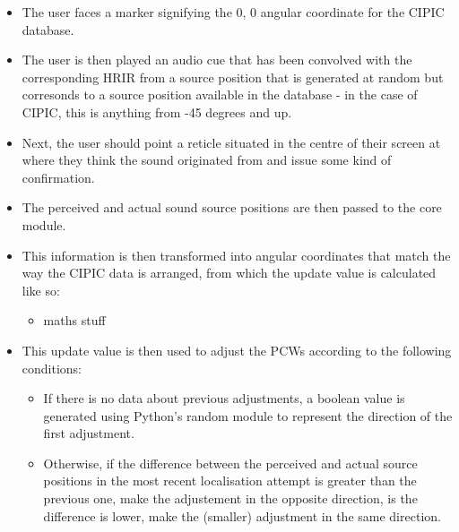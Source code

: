 \begin{itemize}
\item The user faces a marker signifying the 0, 0 angular coordinate for the CIPIC database.
\item The user is then played an audio cue that has been convolved with the corresponding HRIR from a source position that is generated at random but corresonds to a source position available in the database - in the case of CIPIC, this is anything from -45 degrees and up.
\item  Next, the user should point a reticle situated in the centre of their screen at where they think the sound originated from and issue some kind of confirmation. 
\item The perceived and actual sound source positions are then passed to the core module.
\item This information is then transformed into angular coordinates that match the way the CIPIC data is arranged, from which the update value is calculated like so:
\begin{itemize}
\item maths stuff
\end{itemize}
\item This update value is then used to adjust the PCWs according to the following conditions:
\begin{itemize}
\item If there is no data about previous adjustments, a boolean value is generated using Python's random module\citep{python random} to represent the direction of the first adjustment. 
\item Otherwise, if the difference between the perceived and actual source positions in the most recent localisation attempt is greater than the previous one, make the adjustement in the opposite direction, is the difference is lower, make the (smaller) adjustment in the same direction. 
\end{itemize}

\end{itemize}
